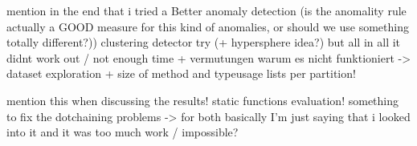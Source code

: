 mention in the end that i tried a 
Better anomaly detection (is the anomality rule actually a GOOD measure for this kind of anomalies, or should we use something totally different?))
    clustering detector try (+ hypersphere idea?)
    but all in all it didnt work out / not enough time
    + vermutungen warum es nicht funktioniert -> dataset exploration + size of method and typeusage lists per partition!

mention this when discussing the results!
    static functions evaluation!
    something to fix the dotchaining problems
    -> for both basically I'm just saying that i looked into it and it was too much work / impossible?

